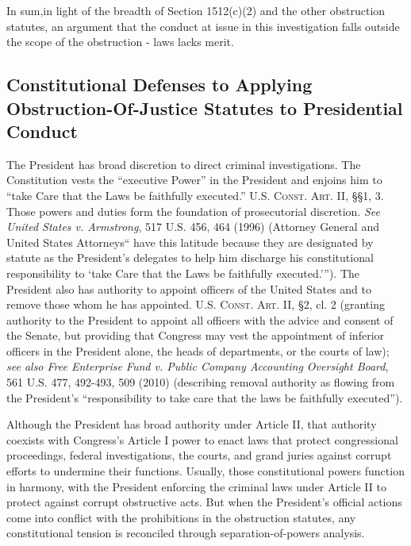 \hr

In sum,in light of the breadth of Section 1512(c)(2) and the other obstruction statutes, an argument that the conduct at issue in this investigation falls outside the scope of the obstruction - laws lacks merit.

\subsection{Constitutional Defenses to Applying Obstruction-Of-Justice Statutes to Presidential Conduct}

The President has broad discretion to direct criminal investigations.
The Constitution vests the “executive Power” in the President and enjoins him to “take Care that the Laws be faithfully executed.” \textsc{U.S. Const. Art. II}, \S\S 1, 3.
Those powers and duties form the foundation of prosecutorial discretion.
\textit{See United States v. Armstrong}, 517 U.S. 456, 464 (1996) (Attorney General and United States Attorneys“ have this latitude because they are designated by statute as the President’s delegates to help him discharge his constitutional responsibility to ‘take Care that the Laws be faithfully executed.’”).
The President also has authority to appoint officers of the United States and to remove those whom he has appointed.
\textsc{U.S. Const. Art. II}, \S 2, cl. 2 (granting authority to the President to appoint all officers with the advice and consent of the Senate, but providing that Congress may vest the appointment of inferior officers in the President alone, the heads of departments, or the courts of law);
\textit{see also Free Enterprise Fund v. Public Company Accounting Oversight Board}, 561 U.S. 477, 492-493, 509 (2010) (describing removal authority as flowing from the President’s “responsibility to take care that the laws be faithfully executed”).

Although the President has broad authority under Article II, that authority coexists with Congress’s Article I power to enact laws that protect congressional proceedings, federal investigations, the courts, and grand juries against corrupt efforts to undermine their functions.
Usually, those constitutional powers function in harmony, with the President enforcing the criminal laws under Article II to protect against corrupt obstructive acts.
But when the President’s official actions come into conflict with the prohibitions in the obstruction statutes, any constitutional tension is reconciled through separation-of-powers analysis.

